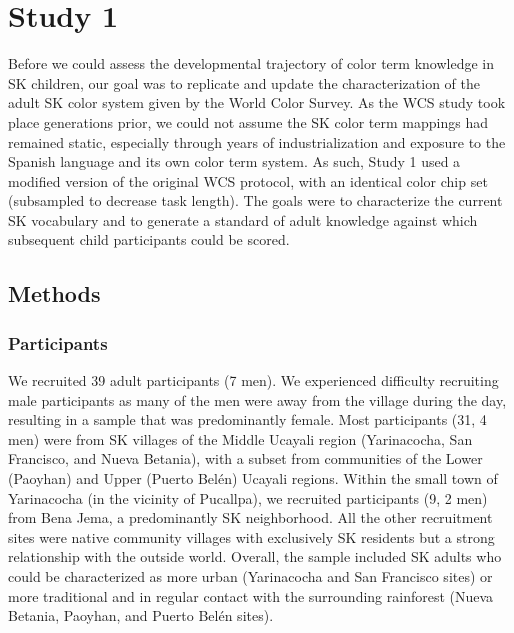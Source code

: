 \documentclass[
  english,
  ,apa7,floatsintext]{apa6}
\begin{document}
\hypertarget{study-1}{%
\section{Study 1}\label{study-1}}

Before we could assess the developmental trajectory of color term knowledge in SK children, our goal was to replicate and update the characterization of the adult SK color system given by the World Color Survey. As the WCS study took place generations prior, we could not assume the SK color term mappings had remained static, especially through years of industrialization and exposure to the Spanish language and its own color term system. As such, Study 1 used a modified version of the original WCS protocol, with an identical color chip set (subsampled to decrease task length). The goals were to characterize the current SK vocabulary and to generate a standard of adult knowledge against which subsequent child participants could be scored.

\hypertarget{methods}{%
\subsection{Methods}\label{methods}}

\hypertarget{participants}{%
\subsubsection{Participants}\label{participants}}

We recruited 39 adult participants (7 men). We experienced difficulty recruiting male participants as many of the men were away from the village during the day, resulting in a sample that was predominantly female. Most participants (31, 4 men) were from SK villages of the Middle Ucayali region (Yarinacocha, San Francisco, and Nueva Betania), with a subset from communities of the Lower (Paoyhan) and Upper (Puerto Belén) Ucayali regions. Within the small town of Yarinacocha (in the vicinity of Pucallpa), we recruited participants (9, 2 men) from Bena Jema, a predominantly SK neighborhood. All the other recruitment sites were native community villages with exclusively SK residents but a strong relationship with the outside world. Overall, the sample included SK adults who could be characterized as more urban (Yarinacocha and San Francisco sites) or more traditional and in regular contact with the surrounding rainforest (Nueva Betania, Paoyhan, and Puerto Belén sites).
\end{document}

